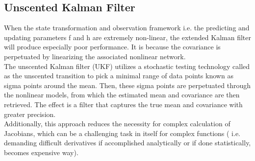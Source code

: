 \documentclass[12pt,a4paper]{article}
\begin{document}
\subsection{Unscented Kalman Filter}
When the state transformation and observation framework i.e. the predicting and updating parameters f and h are extremely non-linear, the extended Kalman filter will produce especially poor performance. It is because the covariance is perpetuated by linearizing the associated nonlinear network.\\
The unscented Kalman filter (UKF) utilizes a stochastic testing technology called as the unscented transition to pick a minimal range of data points known as sigma points around the mean. Then, these sigma points are perpetuated through the nonlinear models, from which the estimated mean and covariance are then retrieved. The effect is a filter that captures the true mean and covariance with greater precision.\cite{terejanu2013discrete}\\
Additionally, this approach reduces the necessity for complex calculation of Jacobians, which can be a challenging task in itself for complex functions ( i.e. demanding difficult derivatives if accomplished analytically or if done statistically, becomes expensive way).\\


\end{document}
